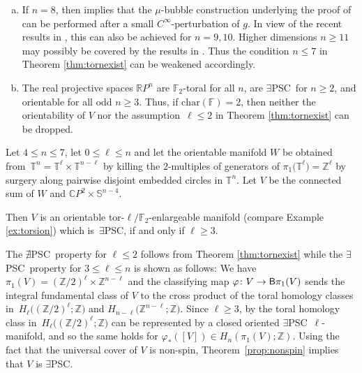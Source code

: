 \documentclass[pdftex]{sigma}
\numberwithin{equation}{section}
\newcommand{\F}{\mathbb{F}}
\newcommand{\Z}{\mathbb{Z}}
\newcommand{\R}{\mathbb{R}}
\newcommand{\SSS}{\mathbb{S}}
\newcommand{\TTT}{\mathbb{T}}
\newcommand{\charac}{\mathrm{char}}
\newcommand{\sB}{{\sf B}}
\newcommand{\no}{{\color{brown!70!black}$\nexists$}{\sf PSC}}
\newcommand{\yes}{{\color {blue!70!black}$\exists$}{\sf PSC}}
\begin{document}
\begin{Remark} \label{rem:higherdim_mantra}\qquad
 \begin{enumerate}[(a)]\itemsep=0pt
\item \label{mantra1} If $n = 8$, then \cite{Smale} implies that the $\mu$-bubble construction underlying the proof of \cite[Theorem 2.8]{Raede22} can be performed after a small $C^{\infty}$-perturbation of $g$.
In view of the recent results in \cite{CMS}, this can also be achieved for $n = 9, 10$.
Higher dimensions $n \geq 11$ may possibly be covered by the results in \cite{Loh2018}.
Thus the condition $n \leq 7$ in Theorem \ref{thm:tornexist} can be weakened accordingly.
\item The real projective spaces $\R P^n$ are $\F_2$-toral for all $n$, are \yes~for $n \geq 2$, and orientable for all odd $n \geq 3$.
Thus, if $\charac(\F) = 2$, then neither the orientability of $V$ nor the assumption~${\ell \leq 2}$ in Theorem \ref{thm:tornexist} can be dropped.
\end{enumerate}
\end{Remark}

\begin{Example} \label{ex:counterexample} Let $4 \leq n \leq 7$, let $0 \leq \ell \leq n $ and let the orientable manifold $W$ be obtained from~${{\TTT}^n = {\TTT}^{\ell} \times {\TTT}^{n-\ell}}$ by killing the $2$-multiples of generators of $\pi_1\big({\TTT}^\ell\big) = \Z^\ell$ by surgery along pairwise disjoint embedded circles in ${\TTT}^n$.
Let $V$ be the connected sum of $W$ and $\mathbb{C} P^{2} \times \SSS^{n-4}$.

Then $V$ is an orientable tor-$\ell / \F_{\!2}$-enlargeable manifold (compare Example \ref{ex:torsion}) which is~\yes, if and only if $\ell \geq 3$.

The \no~property for $\ell \leq 2$ follows from Theorem \ref{thm:tornexist} while the \yes~property for $3 \leq \ell \leq n$ is shown as follows:
We have $\pi_1(V) = (\Z/2)^{\ell} \times \Z^{n-\ell}$ and the classifying map $\varphi \colon V \to \sB \pi_1(V)$ sends the integral fundamental class of $V$ to the cross product of the toral homology classes in~${H_{\ell}\big((\Z/2)^{\ell} ; \Z\big)}$ and $H_{n-\ell}\big(\Z^{n-\ell}; \Z\big)$.
Since $\ell \geq 3$, by \cite[Theorem A]{Jo2004} the toral homology class in~${H_{\ell}\big((\Z/2)^{\ell} ; \Z\big)}$ can be represented by a closed oriented \yes~$\ell$-manifold, and so the same holds for $\varphi_*([V]) \in H_n(\pi_1(V) ; \Z)$.
Using the fact that the universal cover of $V$ is non-spin, Theorem~\ref{prop:nonspin} implies that $V$ is \yes.
\end{Example}
\end{document}
